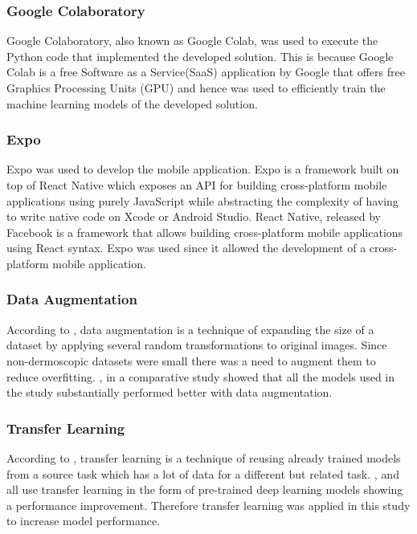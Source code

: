 \documentclass[12pt, a4paper]{article}
\begin{document}
\subsubsection{Google Colaboratory}
Google Colaboratory, also known as Google Colab, was used to execute the Python code that implemented the developed solution. This is because Google Colab is a free Software as a Service(SaaS) application by Google that offers free Graphics Processing Units (GPU) and hence was used to efficiently train the machine learning models of the developed solution.
\subsubsection{Expo}
Expo was used to develop the mobile application. Expo is a framework built on top of React Native which exposes an API for building cross-platform mobile applications using purely JavaScript while abstracting the complexity of having to write native code on Xcode or Android Studio. React Native, released by Facebook is a framework that allows building cross-platform mobile applications using React syntax. Expo was used since it allowed the development of a cross-platform mobile application.
\subsubsection{Data Augmentation}
According to \cite{perez2021convolutional}, data augmentation is a technique of expanding the size of a dataset by applying several random transformations to original images. Since non-dermoscopic datasets were small there was a need to augment them to reduce overfitting. \cite{perez2021convolutional}, in a comparative study showed that all the models used in the study substantially performed better with data augmentation.
\subsubsection{Transfer Learning}
According to \cite{perez2021convolutional}, transfer learning is a technique of reusing already trained models from a source task which has a lot of data for a different but related task. \cite{esteva2017dermatologist}, \cite{HAN20181529} and \cite{perez2021ensemble} all use transfer learning in the form of pre-trained deep learning models showing a performance improvement. Therefore transfer learning was applied in this study to increase model performance. 
\clearpage
\end{document}
